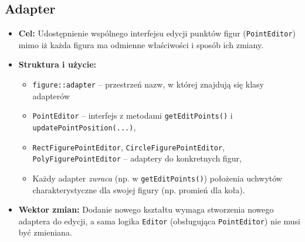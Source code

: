 \documentclass[a4paper,12pt]{article}
\begin{document}
\subsection{Adapter}
\begin{itemize}
    \item \textbf{Cel:} Udostępnienie wspólnego interfejsu edycji punktów figur 
    (\texttt{PointEditor}) mimo iż każda figura ma odmienne właściwości i sposób 
    ich zmiany.
    \item \textbf{Struktura i użycie:}
    \begin{itemize}
      \item \texttt{figure::adapter} -- przestrzeń nazw, w której znajdują się klasy adapterów
      \item \texttt{PointEditor} -- interfejs z metodami \texttt{getEditPoints()}
      i \texttt{updatePointPosition(...)},
      \item \texttt{RectFigurePointEditor}, \texttt{CircleFigurePointEditor}, 
      \texttt{PolyFigurePointEditor} -- adaptery do konkretnych figur,
      \item Każdy adapter \emph{zwraca} (np. w \texttt{getEditPoints()}) położenia uchwytów 
      charakterystyczne dla swojej figury (np. promień dla koła).
    \end{itemize}
    \item \textbf{Wektor zmian:} Dodanie nowego kształtu wymaga stworzenia
    nowego adaptera do edycji, a sama logika \texttt{Editor} (obsługująca \texttt{PointEditor})
    nie musi być zmieniana.
\end{itemize}
\end{document}
